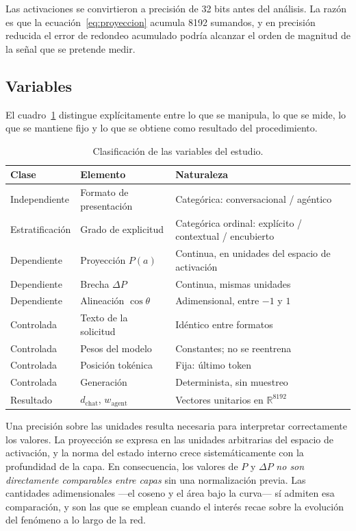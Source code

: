 Las activaciones se convirtieron a precisión de 32 bits antes del análisis. La
razón es que la ecuación~\eqref{eq:proyeccion} acumula 8192 sumandos, y en
precisión reducida el error de redondeo acumulado podría alcanzar el orden de
magnitud de la señal que se pretende medir.

\subsection{Variables}

El cuadro~\ref{tab:variables} distingue explícitamente entre lo que se
manipula, lo que se mide, lo que se mantiene fijo y lo que se obtiene como
resultado del procedimiento.

\begin{table}[htbp]
  \centering
  \small
  \caption{Clasificación de las variables del estudio.}
  \label{tab:variables}
  \begin{tabular}{@{}llp{5.6cm}@{}}
    \toprule
    \textbf{Clase} & \textbf{Elemento} & \textbf{Naturaleza} \\
    \midrule
    Independiente & Formato de presentación & Categórica: conversacional / agéntico \\
    Estratificación & Grado de explicitud & Categórica ordinal: explícito / contextual / encubierto \\
    \addlinespace
    Dependiente & Proyección $P(a)$ & Continua, en unidades del espacio de activación \\
    Dependiente & Brecha $\Delta P$ & Continua, mismas unidades \\
    Dependiente & Alineación $\cos\theta$ & Adimensional, entre $-1$ y $1$ \\
    \addlinespace
    Controlada & Texto de la solicitud & Idéntico entre formatos \\
    Controlada & Pesos del modelo & Constantes; no se reentrena \\
    Controlada & Posición tokénica & Fija: último token \\
    Controlada & Generación & Determinista, sin muestreo \\
    \addlinespace
    Resultado & $d_{\text{chat}}$, $w_{\text{agent}}$ & Vectores unitarios en $\mathbb{R}^{8192}$ \\
    \bottomrule
  \end{tabular}
\end{table}

Una precisión sobre las unidades resulta necesaria para interpretar
correctamente los valores. La proyección se expresa en las unidades arbitrarias
del espacio de activación, y la norma del estado interno crece
sistemáticamente con la profundidad de la capa. En consecuencia, los valores de
$P$ y $\Delta P$ \textit{no son directamente comparables entre capas} sin una
normalización previa. Las cantidades adimensionales —el coseno y el área bajo
la curva— sí admiten esa comparación, y son las que se emplean cuando el
interés recae sobre la evolución del fenómeno a lo largo de la red.

